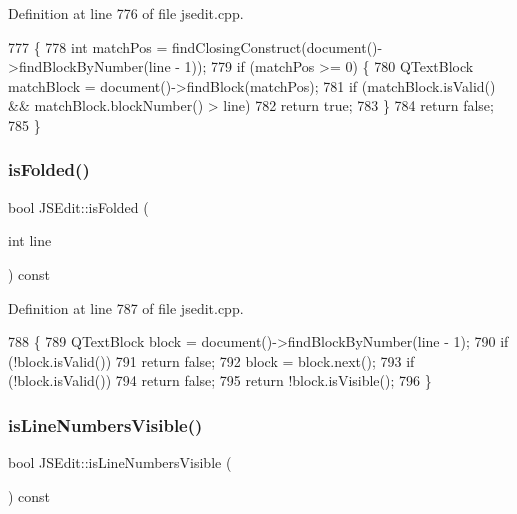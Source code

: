 Definition at line 776 of file jsedit.\+cpp.


\begin{DoxyCode}
777 \{
778     \textcolor{keywordtype}{int} matchPos = findClosingConstruct(document()->findBlockByNumber(line - 1));
779     \textcolor{keywordflow}{if} (matchPos >= 0) \{
780         QTextBlock matchBlock = document()->findBlock(matchPos);
781         \textcolor{keywordflow}{if} (matchBlock.isValid() && matchBlock.blockNumber() > line)
782             \textcolor{keywordflow}{return} \textcolor{keyword}{true};
783     \}
784     \textcolor{keywordflow}{return} \textcolor{keyword}{false};
785 \}
\end{DoxyCode}
\mbox{\label{class_j_s_edit_af06c6789b9046e6b42ec34e94820291b}} 
\subsubsection{\texorpdfstring{is\+Folded()}{isFolded()}}
{\footnotesize\ttfamily bool J\+S\+Edit\+::is\+Folded (\begin{DoxyParamCaption}\item[{int}]{line }\end{DoxyParamCaption}) const}



Definition at line 787 of file jsedit.\+cpp.


\begin{DoxyCode}
788 \{
789     QTextBlock block = document()->findBlockByNumber(line - 1);
790     \textcolor{keywordflow}{if} (!block.isValid())
791         \textcolor{keywordflow}{return} \textcolor{keyword}{false};
792     block = block.next();
793     \textcolor{keywordflow}{if} (!block.isValid())
794         \textcolor{keywordflow}{return} \textcolor{keyword}{false};
795     \textcolor{keywordflow}{return} !block.isVisible();
796 \}
\end{DoxyCode}
\mbox{\label{class_j_s_edit_a72262886ceb0918384629a2cc813777c}} 
\subsubsection{\texorpdfstring{is\+Line\+Numbers\+Visible()}{isLineNumbersVisible()}}
{\footnotesize\ttfamily bool J\+S\+Edit\+::is\+Line\+Numbers\+Visible (\begin{DoxyParamCaption}{ }\end{DoxyParamCaption}) const}



